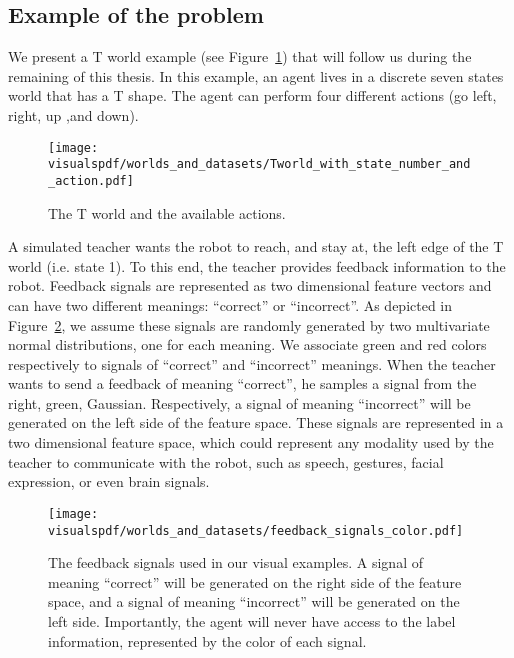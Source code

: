 \subsection{Example of the problem}
\label{chapter:lfui:example}

We present a T world example (see Figure~\ref{fig:Tworld}) that will follow us during the remaining of this thesis. In this example, an agent lives in a discrete seven states world that has a T shape. The agent can perform four different actions (go left, right, up ,and down).

\begin{figure}[!htbp]
  \centering
  \texttt{[image: \\visualspdf/worlds\_and\_datasets/Tworld\_with\_state\_number\_and\_action.pdf]}
  \caption{The T world and the available actions.}
  \label{fig:Tworld}
\end{figure}

A simulated teacher wants the robot to reach, and stay at, the left edge of the T world (i.e. state 1). To this end, the teacher provides feedback information to the robot. Feedback signals are represented as two dimensional feature vectors and can have two different meanings: ``correct'' or ``incorrect''. As depicted in Figure~\ref{fig:feedbacksignals}, we assume these signals are randomly generated by two multivariate normal distributions, one for each meaning. We associate green and red colors respectively to signals of ``correct'' and ``incorrect'' meanings. When the teacher wants to send a feedback of meaning ``correct'', he samples a signal from the right, green, Gaussian. Respectively, a signal of meaning ``incorrect'' will be generated on the left side of the feature space. These signals are represented in a two dimensional feature space, which could represent any modality used by the teacher to communicate with the robot, such as speech, gestures, facial expression, or even brain signals.

\begin{figure}[!htbp]
  \centering
  \texttt{[image: \\visualspdf/worlds\_and\_datasets/feedback\_signals\_color.pdf]}
  \caption{The feedback signals used in our visual examples. A signal of meaning ``correct'' will be generated on the right side of the feature space, and a signal of meaning ``incorrect'' will be generated on the left side. Importantly, the agent will never have access to the label information, represented by the color of each signal.}
  \label{fig:feedbacksignals}
\end{figure}


